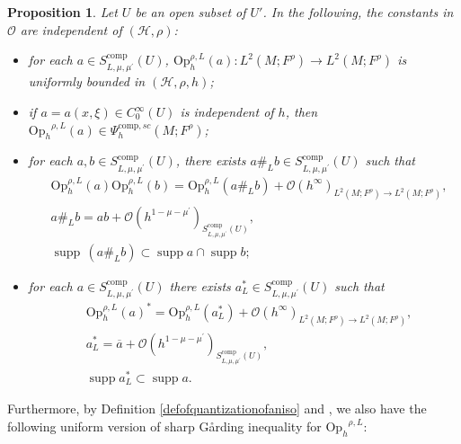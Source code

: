 \documentclass[11pt,oneside,reqno]{amsart}
\newcommand\Oph{\ensuremath{\mathrm{Op}_h}}
\newtheorem{proposition}[theorem]{Proposition}
\theoremstyle{definition}
\numberwithin{equation}{section}
\theoremstyle{plain}
\begin{document}
\begin{proposition}\label{propofanisoquantization}
Let $U$ be an open subset of $U'$. In the following, the constants in $\mathcal{O}$ are independent of $(\mathcal{H},\rho)$: 
\begin{itemize}
\item[(1)] for each $a \in S_{L, \mu, \mu^{\prime}}^{\mathrm{comp}}(U)$, $\mathrm{Op}_h^{\rho, L}(a): L^2(M;F^{\rho}) \rightarrow L^2(M;F^{\rho})$ is uniformly bounded in $(\mathcal{H},\rho,h)$;
\item[(2)] if $a=a(x,\xi)\in C_{0}^{\infty}(U)$ is independent of $h$, then $\Oph^{\rho,L}(a) \in \Psi_{h}^{\mathrm{comp},sc}(M;F^\rho)$;
\item[(3)] for each $a,b \in S_{L, \mu, \mu^{\prime}}^{\mathrm{comp}}(U)$, there exists $a \#_L b \in S_{L, \mu, \mu^{\prime}}^{\mathrm{comp}}(U)$ such that
\begin{equation}
\begin{aligned}
&\mathrm{Op}^{\rho,L}_h(a) \mathrm{Op}^{\rho,L}_h(b) =\mathrm{Op}^{\rho,L}_h(a \#_L b)+\mathcal{O}(h^{\infty})_{L^2(M;F^\rho) \rightarrow L^2(M;F^\rho)} ,\\
&a \#_L b  =a b+\mathcal{O}(h^{1-\mu-\mu^{\prime}})_{S_{L, \mu, \mu^{\prime}}^{\mathrm{comp}}(U)}, \\
&\operatorname{supp}\, (a \#_L b) \subset \operatorname{supp} a \cap \operatorname{supp} b;
\end{aligned}
\end{equation}
\item[(4)] for each $a \in S_{L, \mu, \mu^{\prime}}^{\mathrm{comp}}(U)$ there exists $a_L^* \in S_{L, \mu, \mu^{\prime}}^{\mathrm{comp}}(U) $ such that
\begin{equation}
\begin{aligned}
&\mathrm{Op}^{\rho,L}_h(a)^*  =\mathrm{Op}^{\rho,L}_h(a_L^*)+\mathcal{O}(h^{\infty})_{L^2(M;F^\rho) \rightarrow L^2(M;F^\rho)}, \\
&a_L^*  =\overline{a}+\mathcal{O}(h^{1-\mu-\mu^{\prime}})_{S_{L, \mu, \mu^{\prime}}^{\operatorname{comp}}(U)}, \\
&\operatorname{supp} a_L^* \subset \operatorname{supp} a.
\end{aligned}
\end{equation}
\end{itemize}
\end{proposition}

Furthermore, by Definition \ref{defofquantizationofaniso} and \cite[Lemma A.2]{dyatlov2018semiclassical}, we also have the following uniform version of sharp Gårding inequality for $\Oph^{\rho,L}$:
\end{document}
